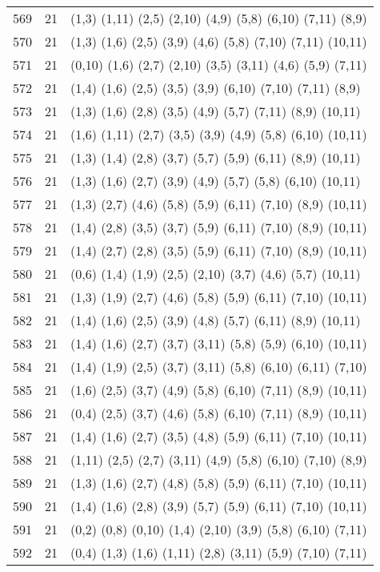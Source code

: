 {\begin{longtable}{lll}
569 & 21 & (1,3) (1,11) (2,5) (2,10) (4,9) (5,8) (6,10) (7,11) (8,9) \\
570 & 21 & (1,3) (1,6) (2,5) (3,9) (4,6) (5,8) (7,10) (7,11) (10,11) \\
571 & 21 & (0,10) (1,6) (2,7) (2,10) (3,5) (3,11) (4,6) (5,9) (7,11) \\
572 & 21 & (1,4) (1,6) (2,5) (3,5) (3,9) (6,10) (7,10) (7,11) (8,9) \\
573 & 21 & (1,3) (1,6) (2,8) (3,5) (4,9) (5,7) (7,11) (8,9) (10,11) \\
574 & 21 & (1,6) (1,11) (2,7) (3,5) (3,9) (4,9) (5,8) (6,10) (10,11) \\
575 & 21 & (1,3) (1,4) (2,8) (3,7) (5,7) (5,9) (6,11) (8,9) (10,11) \\
576 & 21 & (1,3) (1,6) (2,7) (3,9) (4,9) (5,7) (5,8) (6,10) (10,11) \\
577 & 21 & (1,3) (2,7) (4,6) (5,8) (5,9) (6,11) (7,10) (8,9) (10,11) \\
578 & 21 & (1,4) (2,8) (3,5) (3,7) (5,9) (6,11) (7,10) (8,9) (10,11) \\
579 & 21 & (1,4) (2,7) (2,8) (3,5) (5,9) (6,11) (7,10) (8,9) (10,11) \\
580 & 21 & (0,6) (1,4) (1,9) (2,5) (2,10) (3,7) (4,6) (5,7) (10,11) \\
581 & 21 & (1,3) (1,9) (2,7) (4,6) (5,8) (5,9) (6,11) (7,10) (10,11) \\
582 & 21 & (1,4) (1,6) (2,5) (3,9) (4,8) (5,7) (6,11) (8,9) (10,11) \\
583 & 21 & (1,4) (1,6) (2,7) (3,7) (3,11) (5,8) (5,9) (6,10) (10,11) \\
584 & 21 & (1,4) (1,9) (2,5) (3,7) (3,11) (5,8) (6,10) (6,11) (7,10) \\
585 & 21 & (1,6) (2,5) (3,7) (4,9) (5,8) (6,10) (7,11) (8,9) (10,11) \\
586 & 21 & (0,4) (2,5) (3,7) (4,6) (5,8) (6,10) (7,11) (8,9) (10,11) \\
587 & 21 & (1,4) (1,6) (2,7) (3,5) (4,8) (5,9) (6,11) (7,10) (10,11) \\
588 & 21 & (1,11) (2,5) (2,7) (3,11) (4,9) (5,8) (6,10) (7,10) (8,9) \\
589 & 21 & (1,3) (1,6) (2,7) (4,8) (5,8) (5,9) (6,11) (7,10) (10,11) \\
590 & 21 & (1,4) (1,6) (2,8) (3,9) (5,7) (5,9) (6,11) (7,10) (10,11) \\
591 & 21 & (0,2) (0,8) (0,10) (1,4) (2,10) (3,9) (5,8) (6,10) (7,11) \\
592 & 21 & (0,4) (1,3) (1,6) (1,11) (2,8) (3,11) (5,9) (7,10) (7,11) \\

\end{longtable}}
